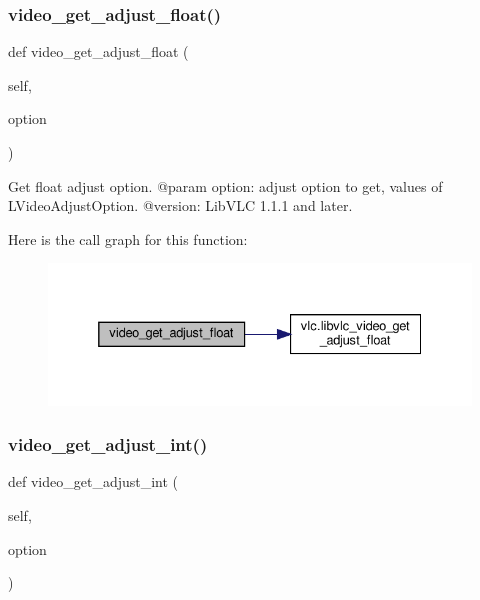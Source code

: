 \subsubsection{\texorpdfstring{video\+\_\+get\+\_\+adjust\+\_\+float()}{video\_get\_adjust\_float()}}
{\footnotesize\ttfamily def video\+\_\+get\+\_\+adjust\+\_\+float (\begin{DoxyParamCaption}\item[{}]{self,  }\item[{}]{option }\end{DoxyParamCaption})}

\begin{DoxyVerb}Get float adjust option.
@param option: adjust option to get, values of L{VideoAdjustOption}.
@version: LibVLC 1.1.1 and later.
\end{DoxyVerb}
 Here is the call graph for this function\+:
\nopagebreak
\begin{figure}[H]
\begin{center}
\leavevmode
\includegraphics[width=332pt]{classvlc_1_1_media_player_a91a961e8cb4b783a2042397f1bba6504_cgraph}
\end{center}
\end{figure}
\mbox{\label{classvlc_1_1_media_player_a8b9d77a54530a6a7ef9a686980c0d58b}} 
\subsubsection{\texorpdfstring{video\+\_\+get\+\_\+adjust\+\_\+int()}{video\_get\_adjust\_int()}}
{\footnotesize\ttfamily def video\+\_\+get\+\_\+adjust\+\_\+int (\begin{DoxyParamCaption}\item[{}]{self,  }\item[{}]{option }\end{DoxyParamCaption})}

